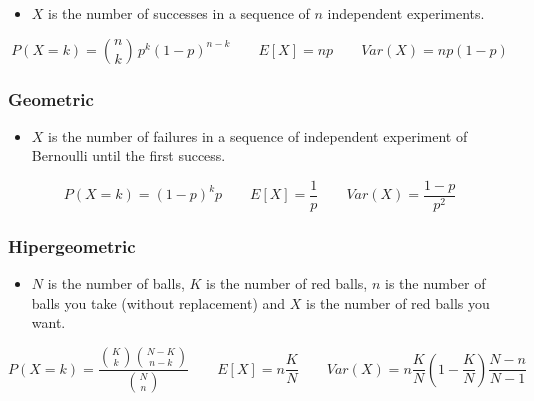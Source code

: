 \begin{itemize}
\item  $X$ is the number of successes in a sequence of $n$ independent experiments.
\end{itemize}

$$P(X = k) = \binom{n}{k}\,p^{k}(1-p)^{n-k} \qquad E[X] = np \qquad Var(X) = np(1-p)$$

\subsubsection{Geometric}
\begin{itemize}
\item $X$ is the number of failures in a sequence of independent experiment of Bernoulli until the first success. 
\end{itemize}

$$P(X = k) = (1-p)^{k}p \qquad E[X] = \frac{1}{p} \qquad Var(X) = \frac{1-p}{p^2}$$


\subsubsection{Hipergeometric}
\begin{itemize}
\item $N$ is the number of balls, $K$ is the number of red balls,
$n$ is the number of balls you take (without replacement) and $X$ is the number of red balls you want.
\end{itemize}

$$P(X = k) = \frac{\binom{K}{k} \binom{N-K}{n-k}}{\binom{N}{n}} \qquad E[X] = n \frac{K}{N} \qquad Var(X) = n \frac{K}{N} (1 - \frac{K}{N}) \frac{N-n}{N-1}$$
